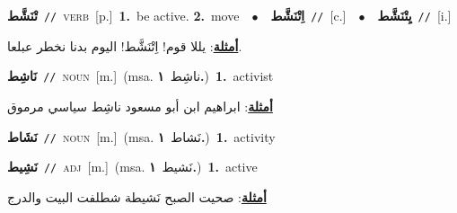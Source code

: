 \documentclass[10pt,a4paper,twoside]{article} %
\begin{document}
\begin{multicols}{2}
{\setlength\topsep{0pt}\textbf{\foreignlanguage{arabic}{تْنَشَّط}}\ {\color{gray}\texttt{//}\color{black}}\ \textsc{verb}\ [p.]\ \textbf{1.}~be active.  \textbf{2.}~move\ \ $\bullet$\ \ \setlength\topsep{0pt}\textbf{\foreignlanguage{arabic}{اِتْنَشَّط}}\ {\color{gray}\texttt{//}\color{black}}\ [c.]\ \ $\bullet$\ \ \setlength\topsep{0pt}\textbf{\foreignlanguage{arabic}{يِتْنَشَّط}}\ {\color{gray}\texttt{//}\color{black}}\ [i.]\  \begin{flushright}\color{gray}\foreignlanguage{arabic}{\textbf{\underline{\foreignlanguage{arabic}{أمثلة}}}: يللا قوم! اِتْنَشَّط! اليوم بدنا نخطر عبلعا.}\end{flushright}\color{black}} \vspace{2mm}

{\setlength\topsep{0pt}\textbf{\foreignlanguage{arabic}{نَاشِط}}\ {\color{gray}\texttt{//}\color{black}}\ \textsc{noun}\ [m.]\ \color{gray}(msa. \foreignlanguage{arabic}{ناشِط}~\foreignlanguage{arabic}{\textbf{١.}})\color{black}\ \textbf{1.}~activist\  \begin{flushright}\color{gray}\foreignlanguage{arabic}{\textbf{\underline{\foreignlanguage{arabic}{أمثلة}}}: ابراهيم ابن أبو مسعود ناشِط سياسي مرموق}\end{flushright}\color{black}} \vspace{2mm}

{\setlength\topsep{0pt}\textbf{\foreignlanguage{arabic}{نَشَاط}}\ {\color{gray}\texttt{//}\color{black}}\ \textsc{noun}\ [m.]\ \color{gray}(msa. \foreignlanguage{arabic}{نَشاط}~\foreignlanguage{arabic}{\textbf{١.}})\color{black}\ \textbf{1.}~activity\ } \vspace{2mm}

{\setlength\topsep{0pt}\textbf{\foreignlanguage{arabic}{نَشِيط}}\ {\color{gray}\texttt{//}\color{black}}\ \textsc{adj}\ [m.]\ \color{gray}(msa. \foreignlanguage{arabic}{نَشيط}~\foreignlanguage{arabic}{\textbf{١.}})\color{black}\ \textbf{1.}~active\  \begin{flushright}\color{gray}\foreignlanguage{arabic}{\textbf{\underline{\foreignlanguage{arabic}{أمثلة}}}: صحيت الصبح نَشيطة شطلفت البيت والدرج}\end{flushright}\color{black}} \vspace{2mm}


\end{multicols}
\end{document}
